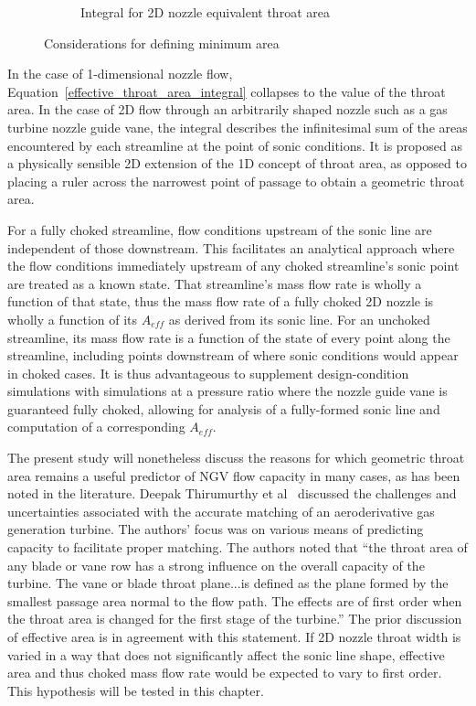 \documentclass[a4paper, 11pt, oneside]{report}
\begin{document}
\begin{figure}[H]
\begin{subfigure}{.45\textwidth}
		\caption{Integral for 2D nozzle equivalent throat area}
		\label{fig:illustration_of_equivalent_throat_area_integral}
	\end{subfigure}
	\caption{Considerations for defining minimum area}
\end{figure}

In the case of 1-dimensional nozzle flow, Equation~\ref{effective_throat_area_integral} collapses to the value of the throat area. In the case of 2D flow through an arbitrarily shaped nozzle such as a gas turbine nozzle guide vane, the integral describes the infinitesimal sum of the areas encountered by each streamline at the point of sonic conditions. It is proposed as a physically sensible 2D extension of the 1D concept of throat area, as opposed to placing a ruler across the narrowest point of passage to obtain a geometric throat area. 

For a fully choked streamline, flow conditions upstream of the sonic line are independent of those downstream. This facilitates an analytical approach where the flow conditions immediately upstream of any choked streamline's sonic point are treated as a known state. That streamline's mass flow rate is wholly a function of that state, thus the mass flow rate of a fully choked 2D nozzle is wholly a function of its $A_{eff}$ as derived from its sonic line. For an unchoked streamline, its mass flow rate is a function of the state of every point along the streamline, including points downstream of where sonic conditions would appear in choked cases. It is thus advantageous to supplement design-condition simulations with simulations at a pressure ratio where the nozzle guide vane is guaranteed fully choked, allowing for analysis of a fully-formed sonic line and computation of a corresponding $A_{eff}$.

The present study will nonetheless discuss the reasons for which geometric throat area remains a useful predictor of NGV flow capacity in many cases, as has been noted in the literature. Deepak Thirumurthy et al~\cite{thirumurthy_throat_area} discussed the challenges and uncertainties associated with the accurate matching of an aeroderivative gas generation turbine. The authors' focus was on various means of predicting capacity to facilitate proper matching. The authors noted that ``the throat area of any blade or vane row has a strong influence on the overall capacity of the turbine. The vane or blade throat plane...is defined as the plane formed by the smallest passage area normal to the flow path. The effects are of first order when the throat area is changed for the first stage of the turbine.'' The prior discussion of effective area is in agreement with this statement. If 2D nozzle throat width is varied in a way that does not significantly affect the sonic line shape, effective area and thus choked mass flow rate would be expected to vary to first order. This hypothesis will be tested in this chapter.
\end{document}
